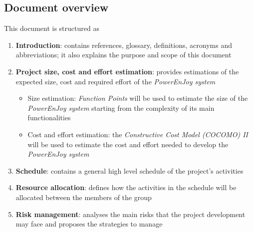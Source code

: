 \subsection{Document overview}
This document is structured as
\begin{enumerate}
	\item \textbf{Introduction}: contains references, glossary, definitions, acronyms and abbreviations; it also explains the purpose and scope of this document
	\item \textbf{Project size, cost and effort estimation}: provides estimations of the expected size, cost and required effort of the \emph{PowerEnJoy system}
	\begin{itemize}
		\item Size estimation: \emph{Function Points} will be used to estimate the size of the \emph{PowerEnJoy system} starting from the complexity of its main functionalities
		\item Cost and effort estimation: the \emph{Constructive Cost Model (COCOMO) II} will be used to estimate the cost and effort needed to develop the \emph{PowerEnJoy system}
	\end{itemize}
	\item \textbf{Schedule}: contains a general high level schedule of the project's activities
	\item \textbf{Resource allocation}: defines how the activities in the schedule will be allocated between the members of the group
	\item \textbf{Risk management}: analyses the main risks that the project development may face and proposes the strategies to manage 
\end{enumerate}